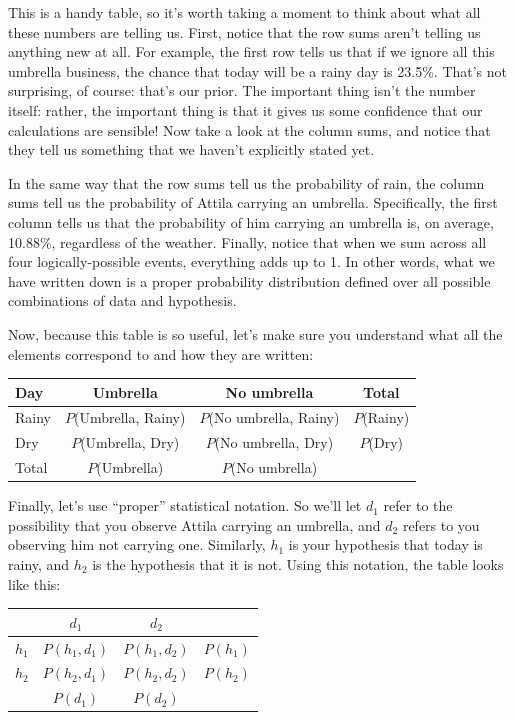 \documentclass[
]{book}
\theoremstyle{definition}
\theoremstyle{definition}
\theoremstyle{definition}
\theoremstyle{definition}
\theoremstyle{remark}
\begin{document}
This is a handy table, so it's worth taking a moment to think about what all these numbers are telling us. First, notice that the row sums aren't telling us anything new at all. For example, the first row tells us that if we ignore all this umbrella business, the chance that today will be a rainy day is 23.5\%. That's not surprising, of course: that's our prior. The important thing isn't the number itself: rather, the important thing is that it gives us some confidence that our calculations are sensible! Now take a look at the column sums, and notice that they tell us something that we haven't explicitly stated yet.

In the same way that the row sums tell us the probability of rain, the column sums tell us the probability of Attila carrying an umbrella. Specifically, the first column tells us that the probability of him carrying an umbrella is, on average, 10.88\%, regardless of the weather. Finally, notice that when we sum across all four logically-possible events, everything adds up to 1. In other words, what we have written down is a proper probability distribution defined over all possible combinations of data and hypothesis.

Now, because this table is so useful, let's make sure you understand what all the elements correspond to and how they are written:

\begin{longtable}[]{@{}lccc@{}}
\toprule()
Day & Umbrella & No umbrella & Total \\
\midrule()
\endhead
Rainy & \(P\)(Umbrella, Rainy) & \(P\)(No umbrella, Rainy) & \(P\)(Rainy) \\
Dry & \(P\)(Umbrella, Dry) & \(P\)(No umbrella, Dry) & \(P\)(Dry) \\
Total & \(P\)(Umbrella) & \(P\)(No umbrella) & \\
\bottomrule()
\end{longtable}

Finally, let's use ``proper'' statistical notation. So we'll let \(d_1\) refer to the possibility that you observe Attila carrying an umbrella, and \(d_2\) refers to you observing him not carrying one. Similarly, \(h_1\) is your hypothesis that today is rainy, and \(h_2\) is the hypothesis that it is not. Using this notation, the table looks like this:

\begin{longtable}[]{@{}lccc@{}}
\toprule()
& \(d_1\) & \(d_2\) & \\
\midrule()
\endhead
\(h_1\) & \(P(h_1, d_1)\) & \(P(h_1, d_2)\) & \(P(h_1)\) \\
\(h_2\) & \(P(h_2, d_1)\) & \(P(h_2, d_2)\) & \(P(h_2)\) \\
& \(P(d_1)\) & \(P(d_2)\) & \\
\bottomrule()
\end{longtable}
\end{document}
